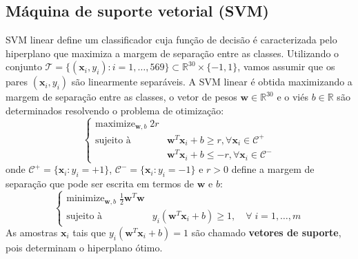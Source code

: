 \documentclass{pssbmac}
\begin{document}
\subsection{Máquina de suporte vetorial (SVM)}
SVM linear define um classificador cuja função de decisão é caracterizada pelo hiperplano que maximiza a margem de separação entre as classes. Utilizando o conjunto $\mathcal{T}=\{(\boldsymbol{x}_i, y_i):i=1, \dots, 569\}\subset\mathbb{R}^{30}\times\{-1, 1\}$, vamos assumir que os pares $(\boldsymbol{x}_i, y_i)$ são linearmente separáveis. A SVM linear é obtida maximizando a margem de separação entre as classes, o vetor de pesos $\boldsymbol{w}\in\mathbb{R}^{30}$ e o viés $b\in\mathbb{R}$ são determinados resolvendo o problema de otimização:
\begin{equation}
    \left\{
    \begin{array}{cc}
        \text{maximize}_{\boldsymbol{w}, b}\; 2r  \\
        \text{sujeito à} & \boldsymbol{w}^{T}\boldsymbol{x}_i + b\geq r, \forall\boldsymbol{x}_i\in\mathcal{C}^{+}\\
        & \boldsymbol{w}^{T}\boldsymbol{x}_i + b\leq -r, \forall\boldsymbol{x}_i\in\mathcal{C}^{-}
    \end{array}
    \right.
\end{equation}
onde $\mathcal{C}^{+}=\{\boldsymbol{x}_i:y_i=+1\}$, $\mathcal{C}^{-}=\{\boldsymbol{x}_i:y_i=-1\}$ e $r>0$ define a margem de separação que pode ser escrita em termos de $\boldsymbol{w}$ e $b$:
\begin{equation}
    \left\{
    \begin{array}{cc}
        \text{minimize}_{\boldsymbol{w}, b}\; \frac{1}{2}\boldsymbol{w}^{T}\boldsymbol{w}  \\
        \text{sujeito à} & y_i(\boldsymbol{w}^{T}\boldsymbol{x}_i+b)\geq 1, \quad\forall\;i=1, \dots, m
    \end{array}
    \right.
\end{equation}
As amostras $\boldsymbol{x}_i$ tais que $y_i(\boldsymbol{w}^{T}\boldsymbol{x}_i+b)=1$ são chamado \textbf{vetores de suporte}, pois determinam o hiperplano ótimo.
\end{document}
